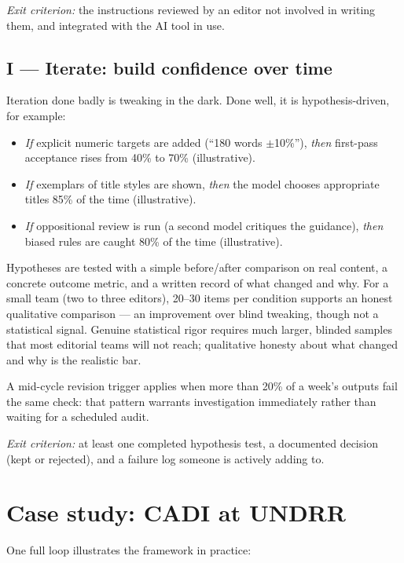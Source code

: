 \documentclass[11pt]{article}
\begin{document}
\emph{Exit criterion:} the instructions reviewed by an editor not
involved in writing them, and integrated with the AI tool in use.

\subsection{I --- Iterate: build confidence over time}

Iteration done badly is tweaking in the dark. Done well, it is
hypothesis-driven, for example:

\begin{itemize}[nosep]
  \item \emph{If} explicit numeric targets are added (``180 words
        $\pm$10\%''), \emph{then} first-pass acceptance rises from 40\%
        to 70\% (illustrative).
  \item \emph{If} exemplars of title styles are shown, \emph{then} the
        model chooses appropriate titles 85\% of the time
        (illustrative).
  \item \emph{If} oppositional review is run (a second model critiques
        the guidance), \emph{then} biased rules are caught 80\% of the
        time (illustrative).
\end{itemize}

Hypotheses are tested with a simple before/after comparison on real
content, a concrete outcome metric, and a written record of what
changed and why. For a small team (two to three editors), 20--30 items
per condition supports an honest qualitative comparison --- an
improvement over blind tweaking, though not a statistical signal.
Genuine statistical rigor requires much larger, blinded samples that
most editorial teams will not reach; qualitative honesty about what
changed and why is the realistic bar.

A mid-cycle revision trigger applies when more than 20\% of a week's
outputs fail the same check: that pattern warrants investigation
immediately rather than waiting for a scheduled audit.

\emph{Exit criterion:} at least one completed hypothesis test, a
documented decision (kept or rejected), and a failure log someone is
actively adding to.

\section{Case study: CADI at UNDRR}

One full loop illustrates the framework in practice:
\end{document}
